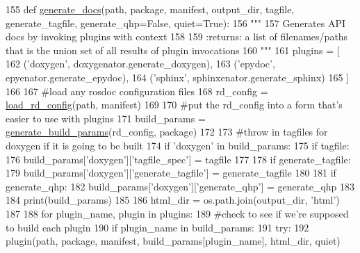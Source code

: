 \begin{DoxyCode}
155 \textcolor{keyword}{def }\hyperlink{namespacerosdoc__lite_a412f06a0ad22f22a437a925f90722ac5}{generate\_docs}(path, package, manifest, output\_dir, tagfile, generate\_tagfile, 
      generate\_qhp=False, quiet=True):
156     \textcolor{stringliteral}{"""}
157 \textcolor{stringliteral}{    Generates API docs by invoking plugins with context}
158 \textcolor{stringliteral}{}
159 \textcolor{stringliteral}{    :returns: a list of filenames/paths that is the union set of all results of plugin invocations}
160 \textcolor{stringliteral}{    """}
161     plugins = [
162         (\textcolor{stringliteral}{'doxygen'}, doxygenator.generate\_doxygen),
163         (\textcolor{stringliteral}{'epydoc'}, epyenator.generate\_epydoc),
164         (\textcolor{stringliteral}{'sphinx'}, sphinxenator.generate\_sphinx)
165                ]
166 
167     \textcolor{comment}{#load any rosdoc configuration files}
168     rd\_config = \hyperlink{namespacerosdoc__lite_a6fc9bd97d3d23ecd8dcb06dcc5b32f73}{load\_rd\_config}(path, manifest)
169 
170     \textcolor{comment}{#put the rd\_config into a form that's easier to use with plugins}
171     build\_params = \hyperlink{namespacerosdoc__lite_a7a0d37797437270150ffb62125868be6}{generate\_build\_params}(rd\_config, package)
172 
173     \textcolor{comment}{#throw in tagfiles for doxygen if it is going to be built}
174     \textcolor{keywordflow}{if} \textcolor{stringliteral}{'doxygen'} \textcolor{keywordflow}{in} build\_params:
175         \textcolor{keywordflow}{if} tagfile:
176             build\_params[\textcolor{stringliteral}{'doxygen'}][\textcolor{stringliteral}{'tagfile\_spec'}] = tagfile
177 
178         \textcolor{keywordflow}{if} generate\_tagfile:
179             build\_params[\textcolor{stringliteral}{'doxygen'}][\textcolor{stringliteral}{'generate\_tagfile'}] = generate\_tagfile
180 
181         \textcolor{keywordflow}{if} generate\_qhp:
182             build\_params[\textcolor{stringliteral}{'doxygen'}][\textcolor{stringliteral}{'generate\_qhp'}] = generate\_qhp
183 
184     print(build\_params)
185 
186     html\_dir = os.path.join(output\_dir, \textcolor{stringliteral}{'html'})
187 
188     \textcolor{keywordflow}{for} plugin\_name, plugin \textcolor{keywordflow}{in} plugins:
189         \textcolor{comment}{#check to see if we're supposed to build each plugin}
190         \textcolor{keywordflow}{if} plugin\_name \textcolor{keywordflow}{in} build\_params:
191             \textcolor{keywordflow}{try}:
192                 plugin(path, package, manifest, build\_params[plugin\_name], html\_dir, quiet)

\end{DoxyCode}
